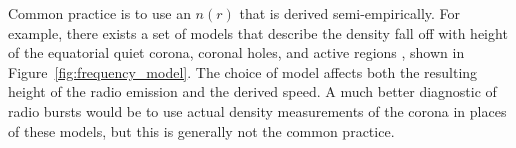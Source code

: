 Common practice is to use an $n(r)$ that is derived semi-empirically. For example, there exists a set of models that describe the density fall off with height of the equatorial quiet corona, coronal holes, and active regions \citet{allen1947, newkirk1961, saito1977}, shown in Figure~\ref{fig:frequency_model}. The choice of model affects both the resulting height of the radio emission and the derived speed. A much better diagnostic of radio bursts would be to use actual density measurements of the corona in places of these models, but this is generally not the common practice.















